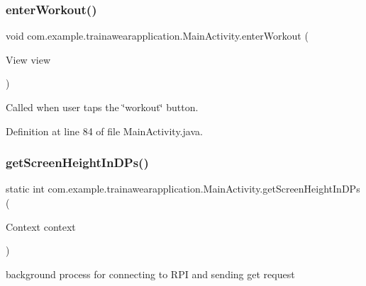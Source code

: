 \subsubsection{\texorpdfstring{enterWorkout()}{enterWorkout()}}
{\footnotesize\ttfamily void com.\+example.\+trainawearapplication.\+Main\+Activity.\+enter\+Workout (\begin{DoxyParamCaption}\item[{View}]{view }\end{DoxyParamCaption})}



Called when user taps the \char`\"{}workout\char`\"{} button. 



Definition at line 84 of file Main\+Activity.\+java.


\begin{DoxyCode}{0}

\end{DoxyCode}
\mbox{\label{classcom_1_1example_1_1trainawearapplication_1_1_main_activity_a9602d3869b7b5392704fbf9fc2b041a9}} 
\subsubsection{\texorpdfstring{getScreenHeightInDPs()}{getScreenHeightInDPs()}}
{\footnotesize\ttfamily static int com.\+example.\+trainawearapplication.\+Main\+Activity.\+get\+Screen\+Height\+In\+D\+Ps (\begin{DoxyParamCaption}\item[{Context}]{context }\end{DoxyParamCaption})\hspace{0.3cm}{\ttfamily [static]}}



background process for connecting to R\+PI and sending get request 

